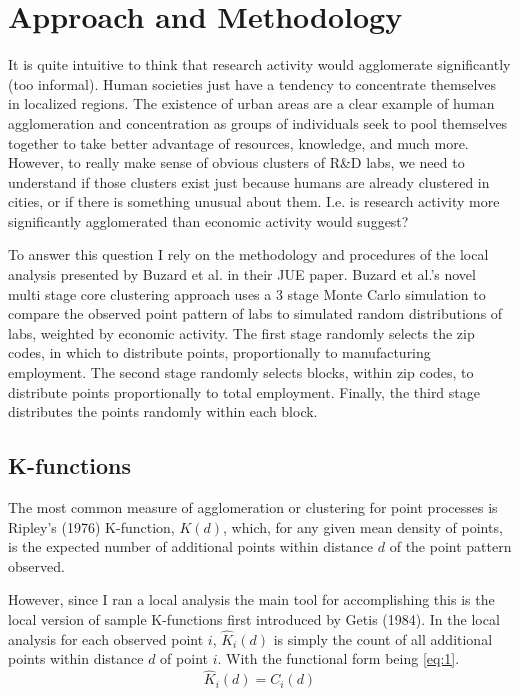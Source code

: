 \documentclass[12pt,letterpaper]{article}
\begin{document}
\section{Approach and Methodology}\label{sec:3}
It is quite intuitive to think that research activity would agglomerate significantly {\color{red}(too informal)}. Human societies just have a tendency to concentrate themselves in localized regions. The existence of urban areas are a clear example of human agglomeration and concentration as groups of individuals seek to pool themselves together to take better advantage of resources, knowledge, and much more. However, to really make sense of obvious clusters of R\&D labs, we need to understand if those clusters exist just because humans are already clustered in cities, or if there is something unusual about them. I.e. is research activity more significantly agglomerated than economic activity would suggest? 
\par
To answer this question I rely on the methodology and procedures of the local analysis presented by Buzard et al. in their JUE paper. Buzard et al.'s novel multi stage core clustering approach uses a 3 stage Monte Carlo simulation to compare the observed point pattern of labs to simulated random distributions of labs, weighted by economic activity. The first stage randomly selects the zip codes, in which to distribute points, proportionally to manufacturing employment. The second stage randomly selects blocks, within zip codes, to distribute points proportionally to total employment. Finally, the third stage distributes the points randomly within each block. 

\subsection{K-functions}
The most common measure of agglomeration or clustering for point processes is Ripley's (1976) K-function, \(K(d)\), which, for any given mean density of points, is the expected number of additional points within distance \(d\) of the point pattern observed.
\par
However, since I ran a local analysis the main tool for accomplishing this is the local version of sample K-functions first introduced by Getis (1984). In the local analysis for each observed point \(i\), \(\hat{K}_{i}(d)\) is simply the count of all additional points within distance \(d\) of point \(i\). With the functional form being \eqref{eq:1}. 
\begin{equation}\label{eq:1}
    \hat{K}_{i}(d) = C_{i}(d)
\end{equation}
\end{document}
